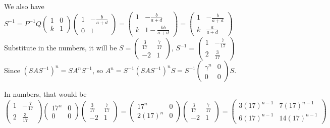 We also have $ S^{-1} = P^{-1}Q \left(\begin{array}{cc}
    1 & 0 \\
    k & 1
  \end{array}\right)\left(\begin{array}{cc}
    1 & -\frac{b}{a+d} \\
    0 & 1
  \end{array}\right) = \left(\begin{array}{cc}
    1 & -\frac{b}{a+d} \\
    k & 1-\frac{kb}{a+d} 
  \end{array}\right) = \left(\begin{array}{cc}
    1 & -\frac{b}{a+d} \\
    k & \frac{a}{a+d} 
  \end{array}\right)$ \\

Substitute in the numbers, it will be $ S = \left(\begin{array}{cc}
    \frac{3}{17} & \frac{7}{17} \\
    -2 & 1
  \end{array}\right)$, $ S^{-1} = \left(\begin{array}{cc}
    1 & -\frac{7}{17} \\
    2 & \frac{3}{17}
  \end{array}\right) $ \\

Since $ (SAS^{-1})^n = SA^nS^{-1} $, so $ A^n = S^{-1}(SAS^{-1})^nS = S^{-1}\left(\begin{array}{cc}
    \gamma^n & 0 \\
    0 & 0
  \end{array}\right)S $.

In numbers, that would be $ \left(\begin{array}{cc}
    1 & -\frac{7}{17} \\
    2 & \frac{3}{17}
  \end{array}\right)\left(\begin{array}{cc}
    17^n & 0 \\
    0 & 0
  \end{array}\right)\left(\begin{array}{cc}
    \frac{3}{17} & \frac{7}{17} \\
    -2 & 1
  \end{array}\right) = \left(\begin{array}{cc}
    17^n & 0 \\
    2(17)^n & 0
  \end{array}\right)\left(\begin{array}{cc}
    \frac{3}{17} & \frac{7}{17} \\
    -2 & 1
  \end{array}\right) = \left(\begin{array}{cc}
    3(17)^{n-1} & 7(17)^{n-1} \\
    6(17)^{n-1} & 14(17)^{n-1}
  \end{array}\right)$
